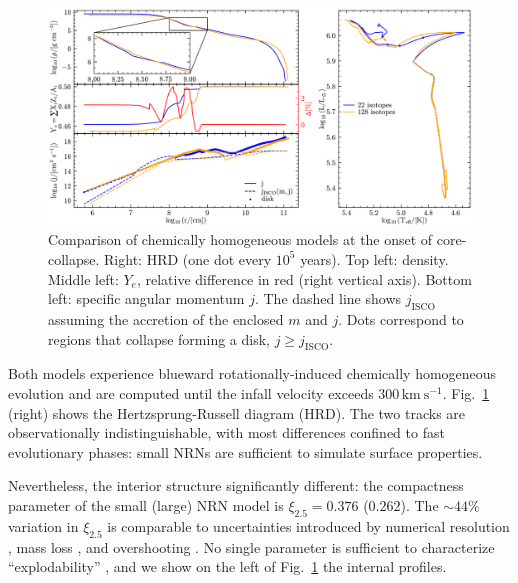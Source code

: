 \documentclass[twocolumn]{aastex63}
\DeclareRobustCommand{\Figref}[1]{Fig.~\ref{#1}}
\begin{document}
\begin{figure}[htbp]
  \centering
  \includegraphics[width=\textwidth]{comparison}
  \caption{Comparison of chemically homogeneous models at the onset of
    core-collapse. Right: HRD (one dot every $10^5$ years).
    Top left: density. Middle left: $Y_e$, relative difference in red
    (right vertical axis). Bottom left: specific angular momentum $j$.
    The dashed line shows $j_\mathrm{ISCO}$ assuming the
    accretion of the enclosed $m$ and $j$. Dots correspond to regions
    that collapse forming a disk, $j\geq j_\mathrm{ISCO}$.}
  \label{fig:comparison}
\end{figure}

Both models experience blueward rotationally-induced chemically
homogeneous evolution \citep[e.g.,][]{maeder:00} and are computed
until the infall velocity exceeds $300\,\mathrm{km\
  s^{-1}}$. %
\Figref{fig:comparison} (right) shows the Hertzsprung-Russell diagram
(HRD). The two tracks are observationally indistinguishable, with most
differences confined to fast evolutionary phases: small NRNs are
sufficient to simulate surface properties.

Nevertheless, the interior structure %
significantly different: %
the compactness parameter \citep{oconnor:11} of the small (large) NRN
model is $\xi_{2.5}=0.376$ ($0.262$). The $\sim{}44\%$ variation in
$\xi_{2.5}$ is comparable to uncertainties introduced by numerical
resolution \citep{farmer:16}, mass loss \citep{renzo:17}, and
overshooting \citep{davis:19}. No single parameter is
sufficient to characterize ``explodability''
\citep[e.g.,][]{ertl:16, vartanyan:21}, and we show on the left
of \Figref{fig:comparison} the internal profiles.%
\end{document}
